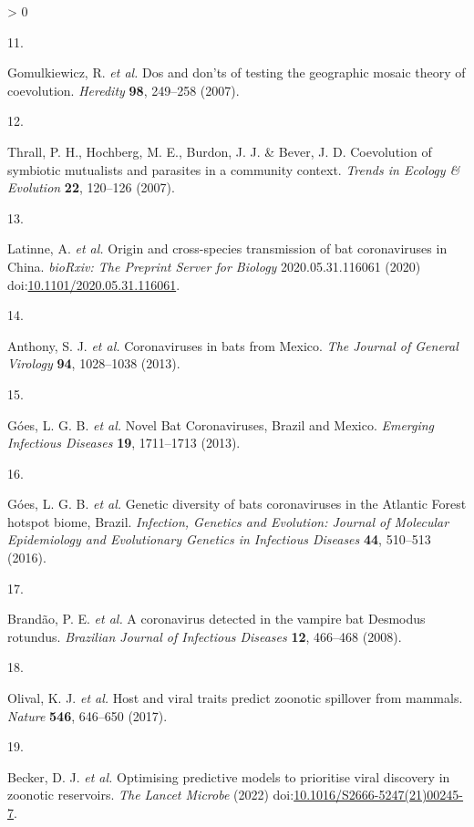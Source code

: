 \documentclass[11pt]{article}
\newlength{\cslhangindent}
\newlength{\csllabelwidth}
\newenvironment{CSLReferences}[3] %
 {%
  \setlength{\parindent}{0pt}
  \ifodd #1 \everypar{\setlength{\hangindent}{\cslhangindent}}\ignorespaces\fi
  \ifnum #2 > 0
  \setlength{\parskip}{#2\baselineskip}
  \fi
 }%
 {}
\newcommand{\CSLLeftMargin}[1]{\parbox[t]{\maxof{\widthof{#1}}{\csllabelwidth}}{#1}}
\newcommand{\CSLRightInline}[1]{\parbox[t]{\linewidth}{#1}}
\begin{document}
\begin{CSLReferences}{0}{0}
\leavevmode\hypertarget{ref-Gomulkiewicz2007DosDon}{}%
\CSLLeftMargin{11. }
\CSLRightInline{Gomulkiewicz, R. \emph{et al.} Dos and don'ts of testing
the geographic mosaic theory of coevolution. \emph{Heredity}
\textbf{98}, 249--258 (2007).}

\leavevmode\hypertarget{ref-Thrall2007CoeSym}{}%
\CSLLeftMargin{12. }
\CSLRightInline{Thrall, P. H., Hochberg, M. E., Burdon, J. J. \& Bever,
J. D. Coevolution of symbiotic mutualists and parasites in a community
context. \emph{Trends in Ecology \& Evolution} \textbf{22}, 120--126
(2007).}

\leavevmode\hypertarget{ref-Latinne2020OriCro}{}%
\CSLLeftMargin{13. }
\CSLRightInline{Latinne, A. \emph{et al.} Origin and cross-species
transmission of bat coronaviruses in China. \emph{bioRxiv: The Preprint
Server for Biology} 2020.05.31.116061 (2020)
doi:\href{https://doi.org/10.1101/2020.05.31.116061}{10.1101/2020.05.31.116061}.}

\leavevmode\hypertarget{ref-Anthony2013CorBat}{}%
\CSLLeftMargin{14. }
\CSLRightInline{Anthony, S. J. \emph{et al.} Coronaviruses in bats from
Mexico. \emph{The Journal of General Virology} \textbf{94}, 1028--1038
(2013).}

\leavevmode\hypertarget{ref-Goes2013NovBat}{}%
\CSLLeftMargin{15. }
\CSLRightInline{Góes, L. G. B. \emph{et al.} Novel Bat Coronaviruses,
Brazil and Mexico. \emph{Emerging Infectious Diseases} \textbf{19},
1711--1713 (2013).}

\leavevmode\hypertarget{ref-Goes2016GenDiv}{}%
\CSLLeftMargin{16. }
\CSLRightInline{Góes, L. G. B. \emph{et al.} Genetic diversity of bats
coronaviruses in the Atlantic Forest hotspot biome, Brazil.
\emph{Infection, Genetics and Evolution: Journal of Molecular
Epidemiology and Evolutionary Genetics in Infectious Diseases}
\textbf{44}, 510--513 (2016).}

\leavevmode\hypertarget{ref-Brandao2008CorDet}{}%
\CSLLeftMargin{17. }
\CSLRightInline{Brandão, P. E. \emph{et al.} A coronavirus detected in
the vampire bat Desmodus rotundus. \emph{Brazilian Journal of Infectious
Diseases} \textbf{12}, 466--468 (2008).}

\leavevmode\hypertarget{ref-Olival2017HosVir}{}%
\CSLLeftMargin{18. }
\CSLRightInline{Olival, K. J. \emph{et al.} Host and viral traits
predict zoonotic spillover from mammals. \emph{Nature} \textbf{546},
646--650 (2017).}

\leavevmode\hypertarget{ref-Becker2022OptPre}{}%
\CSLLeftMargin{19. }
\CSLRightInline{Becker, D. J. \emph{et al.} Optimising predictive models
to prioritise viral discovery in zoonotic reservoirs. \emph{The Lancet
Microbe} (2022)
doi:\href{https://doi.org/10.1016/S2666-5247(21)00245-7}{10.1016/S2666-5247(21)00245-7}.}


\end{CSLReferences}
\end{document}
